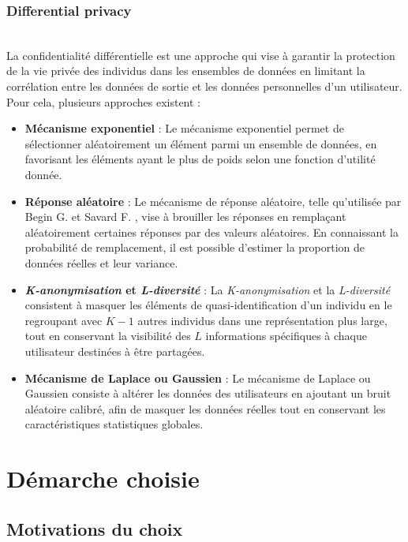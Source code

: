 \documentclass{article}
\begin{document}
\subsubsection{Differential privacy}
$ $\\
La confidentialité différentielle est une approche qui vise à garantir la protection de la vie privée des individus dans les ensembles de données en limitant la corrélation entre les données de sortie et les données personnelles d’un utilisateur.  
Pour cela, plusieurs approches existent :  
\begin{itemize}
    \item \textbf{Mécanisme exponentiel} : Le mécanisme exponentiel \cite{programming_dp} permet de sélectionner aléatoirement un élément parmi un ensemble de données, en favorisant les éléments ayant le plus de poids selon une fonction d’utilité donnée.  
    \item \textbf{Réponse aléatoire} : Le mécanisme de réponse aléatoire, telle qu’utilisée par Begin G. et Savard F. \cite{psychologie}, vise à brouiller les réponses en remplaçant aléatoirement certaines réponses par des valeurs aléatoires. 
    En connaissant la probabilité de remplacement, il est possible d’estimer la proportion de données réelles et leur variance.  
    \item \textbf{\emph{K-anonymisation} et \emph{L-diversité}} : La \emph{K-anonymisation} \cite{kanonymisation} et la \emph{L-diversité} consistent à masquer les éléments de quasi-identification d’un individu en le regroupant avec $K-1$ autres 
    individus dans une représentation plus large, tout en conservant la visibilité des $L$ informations spécifiques à chaque utilisateur destinées à être partagées.  
    \item \textbf{Mécanisme de Laplace ou Gaussien} : Le mécanisme de Laplace ou Gaussien \cite{laplace&gauss} consiste à altérer les données des utilisateurs en ajoutant un bruit aléatoire calibré, afin de masquer les données réelles tout en conservant 
    les caractéristiques statistiques globales.  
\end{itemize}

\section{Démarche choisie}
\subsection{Motivations du choix}
\end{document}
